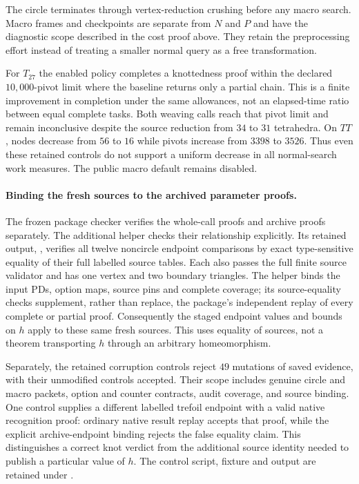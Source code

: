 The circle terminates through vertex-reduction crushing before any
macro search.  Macro frames and checkpoints are separate from $N$ and
$P$ and have the diagnostic scope described in the cost proof above.
They retain the preprocessing effort instead of treating a smaller
normal query as a free transformation.

For $T_{27}$ the enabled policy completes a knottedness proof within
the declared $10{,}000$-pivot limit where the baseline returns only
a partial chain.  This is a finite improvement in completion under
the same allowances, not an elapsed-time ratio between equal complete
tasks.  Both weaving calls reach that pivot limit and remain
inconclusive despite the source reduction from $34$ to $31$
tetrahedra.  On $TT$, nodes decrease from $56$ to $16$ while pivots
increase from $3398$ to $3526$.  Thus even these retained controls
do not support a uniform decrease in all normal-search work measures.
The public macro default remains disabled.

\paragraph{Binding the fresh sources to the archived parameter proofs.}
The frozen package checker verifies the whole-call proofs and archive
proofs separately.  The additional helper
 checks their relationship
explicitly.  Its retained output,
, verifies all twelve
noncircle endpoint comparisons by exact type-sensitive equality of
their full labelled source tables.  Each also passes the full finite
source validator and has one vertex and two boundary triangles.
The helper binds the input PDs, option maps, source pins and complete
coverage; its source-equality checks supplement, rather than replace,
the package's independent replay of every complete or partial proof.
Consequently the staged endpoint values and bounds on $h$ apply to
these same fresh sources.  This uses equality of sources, not a
theorem transporting $h$ through an arbitrary homeomorphism.

Separately, the retained corruption controls reject $49$ mutations
of saved evidence, with their unmodified controls accepted.  Their
scope includes genuine circle and macro packets, option and counter
contracts, audit coverage, and source binding.  One control supplies
a different labelled trefoil endpoint with a valid native recognition
proof: ordinary native result replay accepts that proof, while the
explicit archive-endpoint binding rejects the false equality claim.
This distinguishes a correct knot verdict from the additional source
identity needed to publish a particular value of $h$.  The control
script, fixture and output are retained under
.

